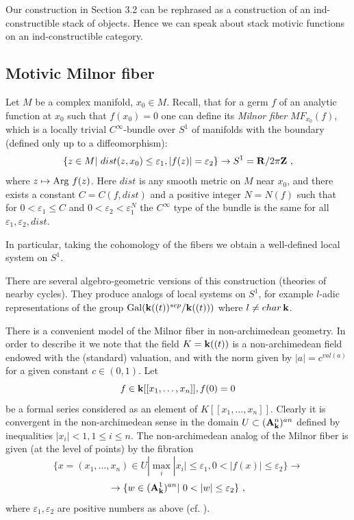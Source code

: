 \documentclass[12pt]{article}
\begin{document}
Our construction in Section 3.2 can be  rephrased as a construction of an ind-constructible stack of objects. Hence we can speak 
about stack motivic  functions on an ind-constructible category.




\subsection{Motivic Milnor fiber}

Let $M$ be a complex manifold, $x_0\in M$. Recall, that for a germ $f$ of an analytic function at $x_0$ such that $f(x_0)=0$ one can define its {\it Milnor fiber } $MF_{x_0}(f)$, which is a locally trivial $C^{\infty}$-bundle over $S^1$  of manifolds with the boundary (defined only up to a diffeomorphism):
$$ \{z\in M|\,\,dist(z,x_0)\le\varepsilon_1, |f(z)|=\varepsilon_2\}\to S^1={\bf R}/2\pi{\bf Z}\,\,,$$
where $z\mapsto \operatorname{Arg}\,f(z)$.
Here $dist$ is any smooth metric on $M$ near $x_0$, and there exists a constant $C=C(f,dist)$ and a positive integer $N=N(f)$ such that for $0<\varepsilon_1\le C$ and $0<\varepsilon_2<\varepsilon_1^N$ the
$C^{\infty}$ type of the bundle is the same for all $\varepsilon_1,\varepsilon_2,dist$.

In particular, taking the cohomology of the fibers we obtain a well-defined local system on $S^1$.

There are several algebro-geometric versions of this construction (theories of nearby cycles). They produce analogs of local systems on $S^1$, for example $l$-adic representations of the group $\operatorname{Gal}({\bf k}((t))^{sep}/{\bf k}((t)))$ where $l\ne char\,{\bf k}$.

There is a convenient model of the Milnor fiber in non-archimedean geometry. In order to describe it we note that the field $K={\bf k}((t))$ is a non-archimedean field endowed with the (standard) valuation, and with the norm given by $|a|=c^{val(a)}$ for a given constant $c \in (0,1)$. Let 
$$f\in {\bf k}[[x_1,\dots,x_n]], f(0)=0$$ be a formal series considered as an element of $K[[x_1,\dots,x_n]]$. Clearly it is convergent in the non-archimedean sense in the domain $U\subset ({\bf A}^n_{{\bf k}})^{an}$ defined by inequalities $|x_i|<1, 1\le i\le n$.
The non-archimedean analog of the Milnor fiber is given (at the level of points) by the fibration 
$$\{x=(x_1,\dots,x_n)\in U|\max_i|x_i|\le\varepsilon_1, 0<|f(x)|\le \varepsilon_2\}\to $$ 
$$\to \{w\in({\bf A}^1_{\k})^{an}|\,\,0<|w|\le \varepsilon_2\}\,\,,$$ where $\varepsilon_1,\varepsilon_2$ are positive numbers as above (cf. \cite{NicS}).
\end{document}
